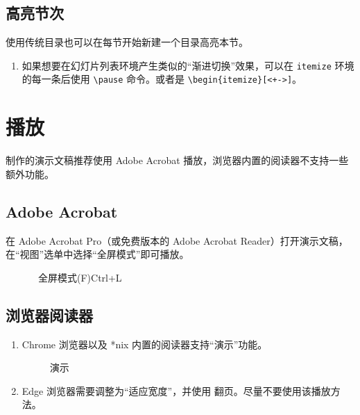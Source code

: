\documentclass[
    UTF8,
    heading=true,
    12pt,
    a4paper
]{ctexrep}
\begin{document}

    \section{高亮节次}

    使用传统目录也可以在每节开始新建一个目录高亮本节。


    \begin{enumerate}\small
        \item 如果想要在幻灯片列表环境产生类似的“渐进切换”效果，可以在 \texttt{itemize} 环境的每一条后使用 \texttt{\textbackslash{}pause} 命令。或者是 \texttt{\textbackslash{}begin\{itemize\}[<+->]}。
    \end{enumerate}

    \chapter{播放}

    制作的演示文稿推荐使用 Adobe Acrobat 播放，浏览器内置的阅读器不支持一些额外功能。

    \section{Adobe Acrobat}

    在 Adobe Acrobat Pro（或免费版本的 Adobe Acrobat Reader）打开演示文稿，在“视图”选单中选择“全屏模式”即可播放。

    \begin{figure}[h]
        \centering
        \begin{tcolorbox}[enhanced, title={视图(V)}, attach boxed title to top left, boxed title style={sharp corners}, sharp corners, tile, width=6cm]
            \faTv\ 全屏模式(F)\hfill Ctrl+L
        \end{tcolorbox}
    \end{figure}

    \section{浏览器阅读器}

    \begin{enumerate}
        \item[\faChrome] Chrome 浏览器以及 *nix 内置的阅读器支持“演示”功能。
        \begin{figure}[h]
            \centering
            \begin{tcolorbox}[enhanced, title={$\vdots$}, attach boxed title to top right, boxed title style={circular arc,top=0mm,bottom=2mm,left=3.25mm,right=3.25mm}, sharp corners, tile, width=6cm]
                演示
            \end{tcolorbox}
        \end{figure} 
        \item[\faInternetExplorer] Edge 浏览器需要调整为“适应宽度”\fbox{\faArrowsH}，并使用  翻页。尽量不要使用该播放方法。
    \end{enumerate}
\end{document}

